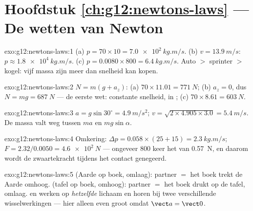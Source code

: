 \section*{Hoofdstuk \ref{ch:g12:newtons-laws} --- De wetten van Newton}

\begin{solution}{exo:g12:newtons-laws:1}
(a) $p = 70 \times 10 = \qty{7.0e2}{kg.m/s}$.
(b) $v = \qty{13.9}{m/s}$: $p \approx \qty{1.8e4}{kg.m/s}$.
(c) $p = 0.0080 \times 800 = \qty{6.4}{kg.m/s}$. Auto $>$ sprinter $>$
kogel: vijf  massa zijn meer dan snelheid kan kopen.
\end{solution}

\begin{solution}{exo:g12:newtons-laws:2}
$N = m(g + a_z)$: (a) $70 \times 11.01 = \qty{771}{N}$; (b) $a_z = 0$,
dus $N = mg = \qty{687}{N}$ --- de eerste wet: constante snelheid,
 in ; (c) $70 \times 8.61 = \qty{603}{N}$.
\end{solution}

\begin{solution}{exo:g12:newtons-laws:3}
$a = g\sin 30^\circ = \qty{4.9}{m/s^2}$;
$v = \sqrt{2 \times 4.905 \times 3.0} = \qty{5.4}{m/s}$. De massa valt weg
tussen $ma$ en $mg\sin\alpha$.
\end{solution}

\begin{solution}{exo:g12:newtons-laws:4}
Omkering: $\Delta p = 0.058 \times (25 + 15) = \qty{2.3}{kg.m/s}$;
$F = 2.32/0.0050 = \qty{4.6e2}{N}$ --- ongeveer $800$ keer het 
van \qty{0.57}{N}, en daarom wordt de zwaartekracht tijdens het contact
genegeerd.
\end{solution}

\begin{solution}{exo:g12:newtons-laws:5}
 (Aarde op boek, omlaag): partner $=$ het boek trekt de Aarde
omhoog.  (tafel op boek, omhoog): partner $=$ het boek drukt
op de tafel, omlaag.  en  werken op \emph{hetzelfde}
lichaam en horen bij twee verschillende wisselwerkingen --- hier alleen
even groot omdat $\vect a = \vect 0$.
\end{solution}

